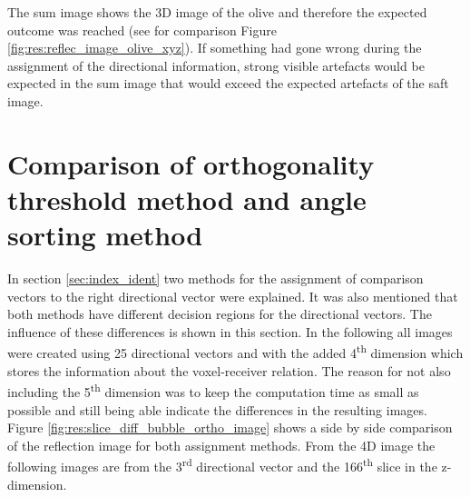 The sum image shows the 3D image of the olive and therefore the expected outcome was reached (see for comparison Figure \ref{fig:res:reflec_image_olive_xyz}). If something had gone wrong during the assignment of the directional information, strong visible artefacts would be expected in the sum image that would exceed the expected artefacts of the \ac{saft} image.



\section{Comparison of orthogonality threshold method and angle sorting method}

In section \ref{sec:index_ident} two methods for the assignment of comparison vectors to the right directional vector were explained. It was also mentioned that both methods have different decision regions for the directional vectors. The influence of these differences is shown in this section. In the following all images were created using 25 directional vectors and with the added 4\textsuperscript{th} dimension which stores the information about the voxel-receiver relation. The reason for not also including the 5\textsuperscript{th} dimension was to keep the computation time as small as possible and still being able indicate the differences in the resulting images. Figure \ref{fig:res:slice_diff_bubble_ortho_image} shows a side by side comparison of the reflection image for both assignment methods. From the 4D image the following images are from the 3\textsuperscript{rd} directional vector and the 166\textsuperscript{th} slice in the z-dimension.


